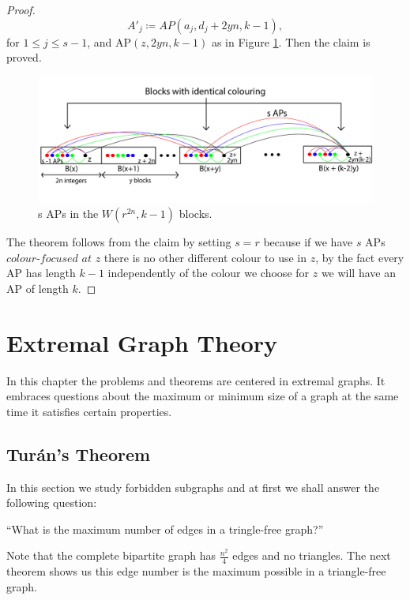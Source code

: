 \documentclass[12pt,twoside,a4paper]{book}
\numberwithin{equation}{section}
\theoremstyle{remark}
\begin{document}
\begin{proof}
$$ A'_j \coloneqq AP(a_j, d_j + 2yn, k-1) , $$
for $1 \leq j \leq s-1$, and AP$(z, 2yn, k-1)$ as in Figure \ref{fig:VanderWaerdenBlocks}. Then the claim is proved.

\begin{figure}[H]
     \centering
     \includegraphics[scale=1.8]{Figuras/Van-der-Waerden-Blocks.jpg}
     \caption{s APs in the $W(r^{2n},k-1)$ blocks.}
     \label{fig:VanderWaerdenBlocks}
\end{figure}

The theorem follows from the claim by setting $s=r$ because if we have $s$  APs $\textit{colour-focused at}$ $z$ there is no other different colour to use in $z$, by the fact every AP has length $k-1$  independently of the colour we choose for $z$ we will have an AP of length $k$.
\end{proof}



\chapter{Extremal Graph Theory}
In this chapter the problems and theorems are centered in extremal graphs. It embraces questions about the maximum or minimum size of a graph at the same time it satisfies certain properties.

\section{Turán's Theorem}
In this section we study forbidden subgraphs and at first we shall answer the following 
question: 
\begin{center}``What is the maximum number of edges in a tringle-free graph?''\end{center}

Note that the complete bipartite graph has $\frac{n^{2}}{4}$ edges and no triangles. The next theorem shows us this edge number is the maximum possible in a triangle-free graph.\\
\end{document}
